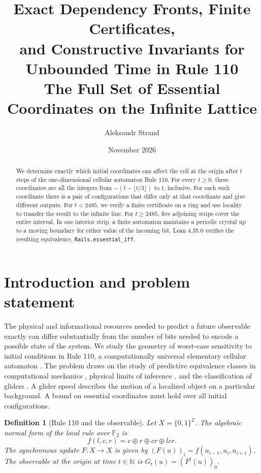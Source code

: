 \documentclass[11pt, a4paper]{article}
\title{\vspace{-1cm}\textbf{\Large Exact Dependency Fronts, Finite Certificates,\\and Constructive Invariants for Unbounded Time in Rule 110}\\[0.45em]
{\large The Full Set of Essential Coordinates on the Infinite Lattice}}
\author{Aleksandr Strand}
\date{November 2026}
\newtheorem{definition}[theorem]{Definition}
\begin{document}
\sloppy
\maketitle
\thispagestyle{plain}

\begin{abstract}
We determine exactly which initial coordinates can affect the cell at the origin after $t$ steps of the one-dimensional cellular automaton Rule 110. For every $t\ge0$, these coordinates are all the integers from $-(t-\lfloor t/3\rfloor)$ to $t$, inclusive. For each such coordinate there is a pair of configurations that differ only at that coordinate and give different outputs. For $t<2485$, we verify a finite certificate on a ring and use locality to transfer the result to the infinite line. For $t\ge2485$, five adjoining strips cover the entire interval. In one interior strip, a finite automaton maintains a periodic crystal up to a moving boundary for either value of the incoming bit. Lean 4.35.0 verifies the resulting equivalence, \texttt{Rails.essential\_iff}.
\end{abstract}

\tableofcontents
\vspace{1em}

\section{Introduction and problem statement}

The physical and informational resources needed to predict a future observable exactly can differ substantially from the number of bits needed to encode a possible state of the system. We study the geometry of worst-case sensitivity to initial conditions in Rule 110, a computationally universal elementary cellular automaton \cite{cook2004}. The problem draws on the study of predictive equivalence classes in computational mechanics \cite{shalizi2001}, physical limits of inference \cite{wolpert2008}, and the classification of gliders \cite{wolfram1986, martinez2006}. A glider speed describes the motion of a localized object on a particular background. A bound on essential coordinates must hold over all initial configurations.

\begin{definition}[Rule 110 and the observable]
Let $X = \{0, 1\}^{\mathbb{Z}}$. The algebraic normal form of the local rule over $\mathbb{F}_2$ is
\begin{equation}\label{eq:rule110}
f(l, c, r) = c \oplus r \oplus cr \oplus lcr.
\end{equation}
The synchronous update $F : X \to X$ is given by $(F(u))_i = f(u_{i-1}, u_i, u_{i+1})$. The observable at the origin at time $t \in \mathbb{N}$ is $G_t(u) = (F^t(u))_0$.
\end{definition}
\end{document}
